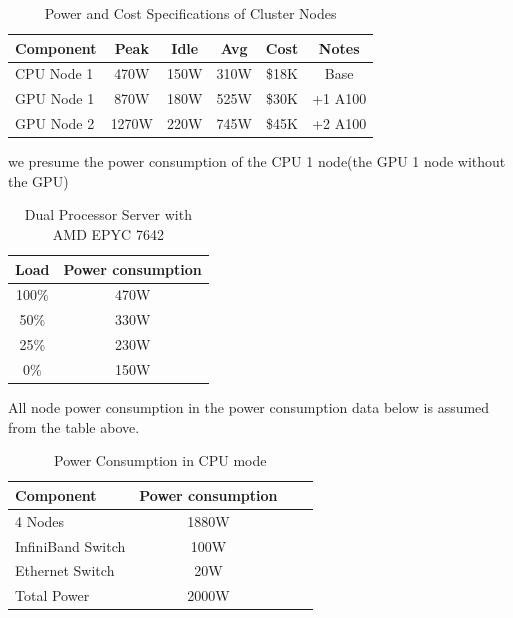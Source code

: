 \documentclass[a4paper,12pt]{article}
\begin{document}
\begin{table}[H] 
\centering
\vspace{0.5cm}
\begin{tabular}{lccccc}
\toprule
Component & Peak & Idle & Avg & Cost & Notes \\
\midrule
CPU Node 1 & 470W & 150W & 310W & \$18K & Base \\
GPU Node 1 & 870W & 180W & 525W & \$30K & +1 A100 \\
GPU Node 2 & 1270W & 220W & 745W & \$45K & +2 A100 \\
\bottomrule
\end{tabular}
\caption{Power and Cost Specifications of Cluster Nodes}
\end{table}

\begin{table}[htbp]
\small
\centering
{}
\caption{Cluster Node Configurations}
\label{tab:node_configs}
\end{table}

we presume the power consumption of the CPU 1 node(the GPU 1 node without the GPU)
\begin{table}[H]
\centering
\vspace{0.5cm}
\begin{tabular}{cc}
\toprule
Load & Power consumption \\
\midrule
100\% & 470W \\
50\% & 330W \\
25\% & 230W \\
0\% & 150W \\
\bottomrule
\end{tabular}
\caption {Dual Processor Server with AMD EPYC 7642}
\end{table}

All node power consumption in the power consumption data below is assumed from the table above.

\begin{table}[H]
\centering
\vspace{0.5cm}
\begin{tabular}{lccc}  %
\toprule
Component & Power consumption \\
\midrule
4 Nodes & 1880W \\
InfiniBand Switch & 100W \\
Ethernet Switch & 20W \\
Total Power & 2000W \\
\bottomrule
\end{tabular}
\caption{Power Consumption in CPU mode}
\end{table}
\end{document}

